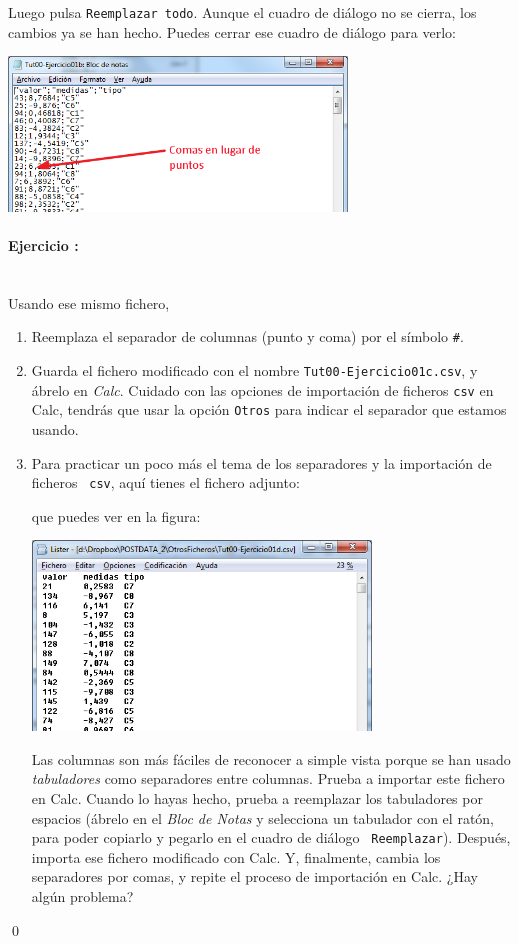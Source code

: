 \documentclass[10pt,a4paper]{article}
\begin{document}
Luego pulsa {\tt Reemplazar todo}. Aunque el cuadro de diálogo no se cierra, los cambios ya se han
hecho. Puedes cerrar ese cuadro de diálogo para verlo:
        \begin{center}
        \includegraphics[width=9cm]{../fig/Tut00-EjercicioI-d.png}
        \end{center}
\paragraph{Ejercicio \theEjercicioII:}\quad\\
Usando ese mismo fichero,
\begin{enumerate}
  \item Reemplaza el separador de columnas (punto y coma) por el símbolo \verb|#|.
  \item Guarda el fichero modificado con el nombre {\tt Tut00-Ejercicio01c.csv}, y ábrelo en {\em       Calc}. Cuidado con las opciones de importación de ficheros {\tt csv} en Calc, tendrás que
      usar la opción {\tt Otros} para indicar el separador que estamos usando.
  \item Para practicar un poco más el tema de los separadores y la importación de ficheros {\tt
      csv}, aquí tienes el fichero adjunto:
        \begin{center}
        \end{center}
      que puedes ver en la figura:
        \begin{center}
        \includegraphics[width=9cm]{../fig/Tut00-EjercicioII.png}
        \end{center}
      Las columnas son más fáciles de reconocer a simple vista porque se han usado {\em
      tabuladores} como separadores entre columnas. Prueba a importar este fichero en Calc.
      Cuando lo hayas hecho, prueba a reemplazar los tabuladores por espacios (ábrelo en el {\em Bloc de Notas} y selecciona un
      tabulador con el ratón, para poder copiarlo y pegarlo en el cuadro de diálogo {\tt
      Reemplazar}). Después, importa ese fichero modificado con Calc. Y, finalmente, cambia los
      separadores por comas, y repite el proceso de importación en Calc. ¿Hay algún problema?
\end{enumerate}
\qed
\end{document}
